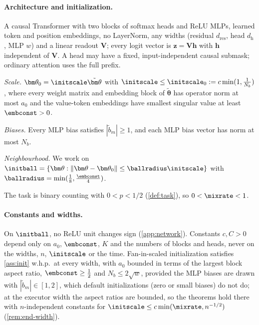 \paragraph{Architecture and initialization.}

\begin{assumption}[Architecture]
\label{ass:arch}
A causal Transformer with two blocks of softmax heads and ReLU MLPs, learned token and position
embeddings, no LayerNorm, any widths (residual $d_{\mathrm{res}}$, head $d_{\mathrm h}$, MLP $w$) and a linear readout $\mathbf V$;
every logit vector is $\bm z=\mathbf V\bm h$ with $\bm h$ independent of $\mathbf V$. A head may have a fixed, input-independent causal submask;
ordinary attention uses the full prefix.
\end{assumption}

\begin{assumption}[Initialization]
\label{ass:init}
\emph{Scale.} $\bm\theta_0=\initscale\tilde{\bm\theta}$ with $\initscale\le\initscale_0:=c\min(1,\frac{1}{N_b})$, where every weight matrix and embedding block of $\tilde{\bm\theta}$ has operator norm
at most $a_0$ and the value-token embeddings have smallest singular value at least $\embconst>0$.

\emph{Biases.} Every MLP bias satisfies $|\tilde b_m|\ge1$, and each MLP bias vector has norm at most $N_b$.

\emph{Neighbourhood.} We work on
$\initball=\{\bm\theta:\|\bm\theta-\bm\theta_0\|\le\ballradius\initscale\}$ with $\ballradius=\min(\frac{1}{8},\frac{\embconst}{4})$.
\end{assumption}

\begin{assumption}[Task]
\label{ass:task}
The task is binary counting with $0<p<1/2$ (\cref{def:task}), so $0<\mixrate<1$.
\end{assumption}

\paragraph{Constants and widths.} On $\initball$, no ReLU unit changes sign (\cref{app:network}). Constants $c,C>0$ depend only on $a_0$, $\embconst$, $K$
and the numbers of blocks and heads, never on the widths, $n$, $\initscale$ or the time. Fan-in-scaled initialization
satisfies \cref{ass:init} w.h.p.\ at every width, with $a_0$ bounded in terms of the largest block aspect ratio,
$\embconst\ge\tfrac{1}{2}$ and $N_b\le2\sqrt w$, provided the MLP biases are drawn with $|\tilde b_m|\in[1,2]$, which default
initializations (zero or small biases) do not do; at the executor width the aspect ratios are bounded, so the theorems
hold there with $n$-independent constants for $\initscale\le c\min(\mixrate,n^{-1/2})$ (\cref{rem:end-width}).

